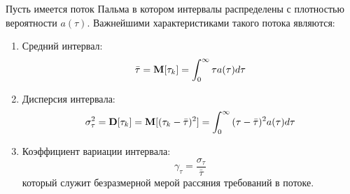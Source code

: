 Пусть имеется поток Пальма в котором интервалы распределены с плотностью вероятности $a(\tau)$. Важнейшими характеристиками такого потока являются:
\begin{enumerate}
	\item Средний интервал: 
	$$\bar{\tau} = \mathbf{M}[\tau_k] = \int_0^\infty{\tau a(\tau) d\tau}$$
	\item Дисперсия интервала:
	$$\sigma^2_\tau = \mathbf{D}[\tau_k] = \mathbf{M}[(\tau_k - \bar{\tau})^2] = \int_0^\infty {(\tau - \bar{\tau})^2 a(\tau) d\tau}$$  
	\item Коэффициент вариации интервала:
	$$\gamma_\tau = \frac{\sigma_\tau}{\bar{\tau}}$$
	который служит безразмерной мерой рассяния требований в потоке.
\end{enumerate}